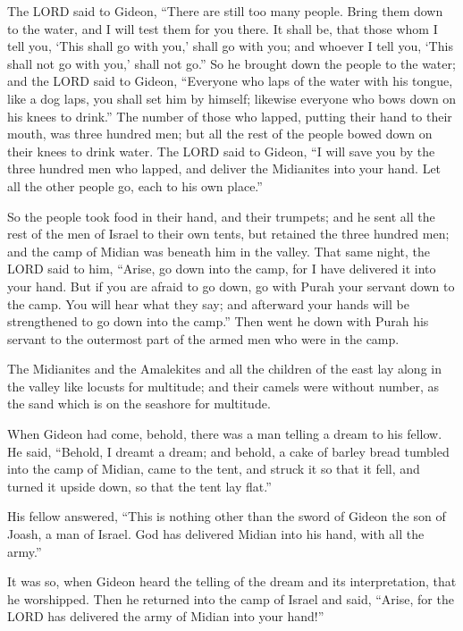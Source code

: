  The LORD said to Gideon, ``There are still too many people.
Bring them down to the water, and I will test them for you there. It
shall be, that those whom I tell you, `This shall go with you,' shall go
with you; and whoever I tell you, `This shall not go with you,' shall
not go.''  So he brought down the people to the water; and
the LORD said to Gideon, ``Everyone who laps of the water with his
tongue, like a dog laps, you shall set him by himself; likewise everyone
who bows down on his knees to drink.''  The number of those
who lapped, putting their hand to their mouth, was three hundred men;
but all the rest of the people bowed down on their knees to drink water.
 The LORD said to Gideon, ``I will save you by the three
hundred men who lapped, and deliver the Midianites into your hand. Let
all the other people go, each to his own place.''

 So the people took food in their hand, and their trumpets;
and he sent all the rest of the men of Israel to their own tents, but
retained the three hundred men; and the camp of Midian was beneath him
in the valley.  That same night, the LORD said to him,
``Arise, go down into the camp, for I have delivered it into your hand.
 But if you are afraid to go down, go with Purah your
servant down to the camp.  You will hear what they say; and
afterward your hands will be strengthened to go down into the camp.''
Then went he down with Purah his servant to the outermost part of the
armed men who were in the camp.

 The Midianites and the Amalekites and all the children of
the east lay along in the valley like locusts for multitude; and their
camels were without number, as the sand which is on the seashore for
multitude.

 When Gideon had come, behold, there was a man telling a
dream to his fellow. He said, ``Behold, I dreamt a dream; and behold, a
cake of barley bread tumbled into the camp of Midian, came to the tent,
and struck it so that it fell, and turned it upside down, so that the
tent lay flat.''

 His fellow answered, ``This is nothing other than the
sword of Gideon the son of Joash, a man of Israel. God has delivered
Midian into his hand, with all the army.''

 It was so, when Gideon heard the telling of the dream and
its interpretation, that he worshipped. Then he returned into the camp
of Israel and said, ``Arise, for the LORD has delivered the army of
Midian into your hand!''

